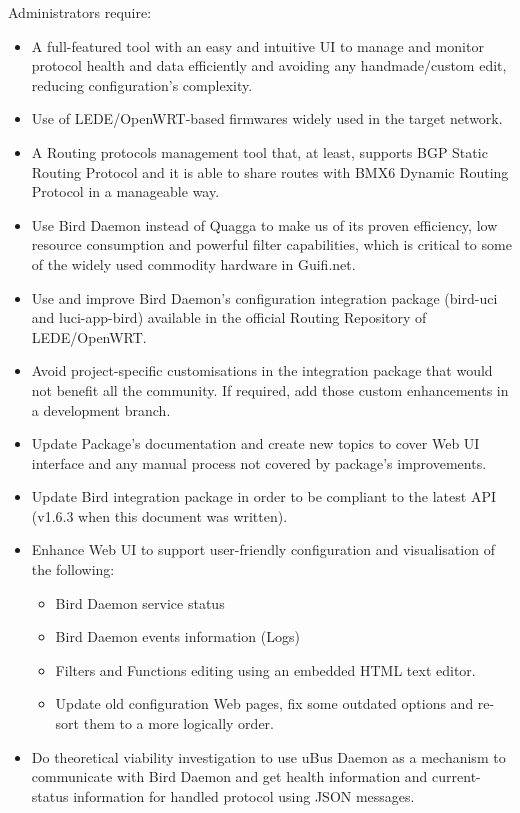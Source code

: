 Administrators require:
\begin{itemize}
    \item A full-featured tool with an easy and intuitive UI to manage and monitor protocol health and data efficiently and avoiding any handmade/custom edit, reducing configuration's complexity.
    \item Use of LEDE/OpenWRT-based firmwares widely used in the target network.
    \item A Routing protocols management tool that, at least, supports BGP Static Routing Protocol and it is able to share routes with BMX6 Dynamic Routing Protocol in a manageable way.
    \item Use Bird Daemon instead of Quagga to make us of its proven efficiency, low resource consumption and powerful filter capabilities, which is critical to some of the widely used commodity hardware in Guifi.net.
    \item Use and improve Bird Daemon's configuration integration package (bird-uci and luci-app-bird) available in the official Routing Repository of LEDE/OpenWRT.
    \item Avoid project-specific customisations in the integration package that would not benefit all the community. If required, add those custom enhancements in a development branch.
    \item Update Package's documentation and create new topics to cover Web UI interface and any manual process not covered by package's improvements.
    \item Update Bird integration package in order to be compliant to the latest API (v1.6.3 when this document was written).
    \item Enhance Web UI to support user-friendly configuration and visualisation of the following:
    \begin{itemize}
        \item Bird Daemon service status
        \item Bird Daemon events information (Logs)
        \item Filters and Functions editing using an embedded HTML text editor.
        \item Update old configuration Web pages, fix some outdated options and re-sort them to a more logically order.
    \end{itemize}
    \item Do theoretical viability investigation to use uBus Daemon as a mechanism to communicate with Bird Daemon and get health information and current-status information for handled protocol using JSON messages.
\end{itemize}

